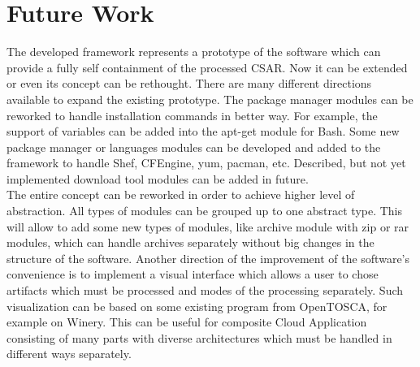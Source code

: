 \section*{Future Work}
The developed framework represents a prototype of the software which can provide a fully self containment of the processed CSAR.
Now it can be extended or even its concept can be rethought.
There are many different directions available to expand the existing prototype.
The package manager modules can be reworked to handle installation commands in better way.
For example, the support of variables can be added into the apt-get module for Bash.
Some new package manager or languages modules can be developed and added to the framework to handle Shef, CFEngine, yum, pacman, etc.
Described, but not yet implemented download tool modules can be added in future.\\
The entire concept can be reworked in order to achieve higher level of abstraction.
All types of modules can be grouped up to one abstract type.
This will allow to add some new types of modules, like archive module with zip or rar modules, which can handle archives separately without big changes in the structure of the software.
Another direction of the improvement of the software's convenience is to implement a visual interface which allows a user to chose artifacts which must be processed and modes of the processing separately.
Such visualization can be based on some existing program from OpenTOSCA, for example on Winery.
This can be useful for composite Cloud Application consisting of many parts with diverse architectures which must be handled in different ways separately.

